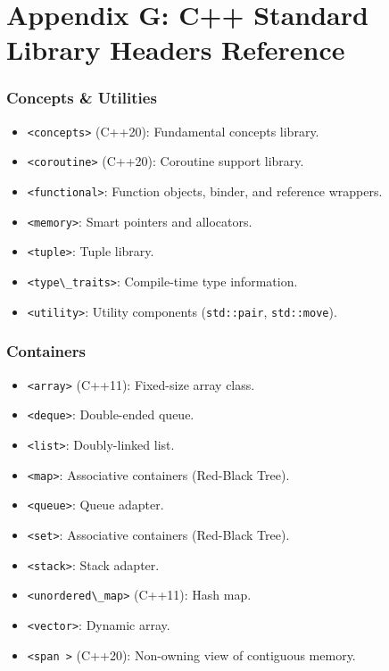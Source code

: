 \hypertarget{appendix-g-c-standard-library-headers-reference}{%
\section{Appendix G: C++ Standard Library Headers
Reference}\label{appendix-g-c-standard-library-headers-reference}}

\hypertarget{concepts-utilities}{%
\subsubsection{Concepts \& Utilities}\label{concepts-utilities}}

\begin{itemize}
\tightlist
\item
  \passthrough{\lstinline!<concepts>!} (C++20): Fundamental concepts
  library.
\item
  \passthrough{\lstinline!<coroutine>!} (C++20): Coroutine support
  library.
\item
  \passthrough{\lstinline!<functional>!}: Function objects, binder, and
  reference wrappers.
\item
  \passthrough{\lstinline!<memory>!}: Smart pointers and allocators.
\item
  \passthrough{\lstinline!<tuple>!}: Tuple library.
\item
  \passthrough{\lstinline!<type\_traits>!}: Compile-time type
  information.
\item
  \passthrough{\lstinline!<utility>!}: Utility components
  (\passthrough{\lstinline!std::pair!},
  \passthrough{\lstinline!std::move!}).
\end{itemize}

\hypertarget{containers}{%
\subsubsection{Containers}\label{containers}}

\begin{itemize}
\tightlist
\item
  \passthrough{\lstinline!<array>!} (C++11): Fixed-size array class.
\item
  \passthrough{\lstinline!<deque>!}: Double-ended queue.
\item
  \passthrough{\lstinline!<list>!}: Doubly-linked list.
\item
  \passthrough{\lstinline!<map>!}: Associative containers (Red-Black
  Tree).
\item
  \passthrough{\lstinline!<queue>!}: Queue adapter.
\item
  \passthrough{\lstinline!<set>!}: Associative containers (Red-Black
  Tree).
\item
  \passthrough{\lstinline!<stack>!}: Stack adapter.
\item
  \passthrough{\lstinline!<unordered\_map>!} (C++11): Hash map.
\item
  \passthrough{\lstinline!<vector>!}: Dynamic array.
\item
  \passthrough{\lstinline!<span >!} (C++20): Non-owning view of
  contiguous memory.
\end{itemize}

